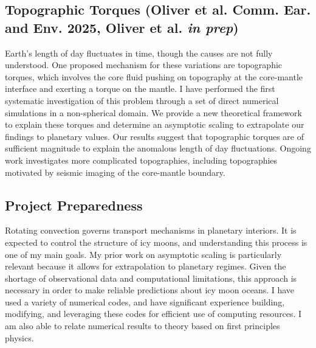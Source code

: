 \documentclass[12pt]{article}
\begin{document}
\subsection*{Topographic Torques (Oliver et al. Comm. Ear. and Env. 2025, Oliver et al. \textit{in prep})}
Earth's length of day fluctuates in time, though the causes are not fully understood.
One proposed mechanism for these variations are topographic torques, which involves the core fluid pushing on topography at the core-mantle interface and exerting a torque on the mantle. 
I have performed the first systematic investigation of this problem through a set of direct numerical simulations in a non-spherical domain.
We provide a new theoretical framework to explain these torques and determine an asymptotic scaling to extrapolate our findings to planetary values.
Our results suggest that topographic torques are of sufficient magnitude to explain the anomalous length of day fluctuations. 
Ongoing work investigates more complicated topographies, including topographies motivated by seismic imaging of the core-mantle boundary.
\subsection*{Project Preparedness}
Rotating convection governs transport mechanisms in planetary interiors. It is expected to control the structure of icy moons, and understanding this process is one of my main goals.
My prior work on asymptotic scaling is particularly relevant because it allows for 
extrapolation to planetary regimes. 
Given the shortage of observational data and computational limitations, this approach is necessary in order to make reliable predictions about icy moon oceans.
I have used a variety of numerical codes, and have significant experience building, modifying, and leveraging these codes for efficient use of computing resources. I am also able to relate numerical results to theory based on first principles physics.
\end{document}
